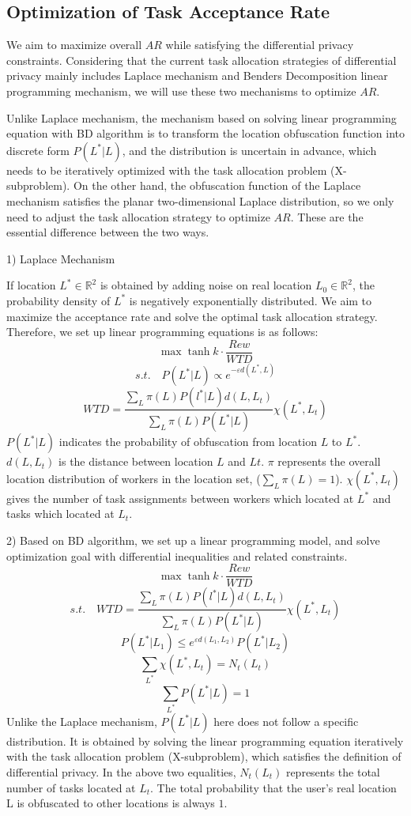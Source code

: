 \subsection{Optimization of Task Acceptance Rate} %
We aim to maximize overall $AR$ while satisfying the differential privacy constraints. Considering that the current task allocation strategies of differential privacy mainly includes Laplace mechanism and Benders Decomposition linear programming mechanism, we will use these two mechanisms to optimize $AR$.

Unlike Laplace mechanism, the mechanism based on solving linear programming equation with BD algorithm is to transform the location obfuscation function into discrete form $P(L^*|L)$, and the distribution is uncertain in advance, which needs to be iteratively optimized with the task allocation problem (X-subproblem). On the other hand, the obfuscation function of the Laplace mechanism satisfies the planar two-dimensional Laplace distribution, so we only need to adjust the task allocation strategy to optimize $AR$. These are the essential difference between the two ways.

1) Laplace Mechanism

If location $L^* \in \mathbb R^2$ is obtained by adding noise on real location $L_0 \in \mathbb R^2$, the probability density of $L^*$ is negatively exponentially distributed. We aim to maximize the acceptance rate and solve the optimal task allocation strategy. Therefore, we set up linear programming equations is as follows:
$$
	\max \tanh {k \cdot \frac{Rew}{WTD}}
$$
$$
	s.t. \quad P(L^*|L) \propto e^{-\varepsilon d(L^*,L)}
$$
$$
	WTD=\frac {\sum_L \pi(L) P(l^*|L) d(L,L_t)} {\sum_L \pi(L) P(L^*|L)} \chi(L^*,L_t)
$$
$P(L^*|L)$ indicates the probability of obfuscation from location $L$ to $L^*$. $d(L,L_t)$ is the distance between location $L$ and $Lt$. $\pi$ represents the overall location distribution of workers in the location set, ($\sum_L \pi(L)=1$). $\chi(L^*,L_t)$ gives the number of task assignments between workers which located at $L^*$ and tasks which located at $L_t$. 

2) Based on BD algorithm, we set up a linear programming model, and solve optimization goal with differential inequalities and related constraints.
$$
	\max \tanh {k \cdot \frac{Rew}{WTD}}
$$
$$
	s.t. \quad WTD=\frac {\sum_L \pi(L) P(l^*|L) d(L,L_t)} {\sum_L \pi(L) P(L^*|L)} \chi(L^*,L_t)
$$
$$
	P(L^*|L_1) \leq e^{\varepsilon d(L_1,L_2)} P(L^*|L_2) 
$$
$$
	\sum_{L^*} \chi(L^*,L_t)=N_t (L_t)
$$
$$
	\sum_{L^*} P(L^*|L)=1
$$
Unlike the Laplace mechanism, $P(L^*|L)$ here does not follow a specific distribution. It is obtained by solving the linear programming equation iteratively with the task allocation problem (X-subproblem), which satisfies the definition of differential privacy. In the above two equalities, $N_t (L_t)$ represents the total number of tasks located at $L_t$. The total probability that the user’s real location L is obfuscated to other locations is always $1$.

